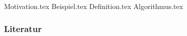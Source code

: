 \documentclass[aspectratio=\BeamerAspectRatio]{beamer}
\begin{document}
\maketitlepage %
\makesectionpopup %

{Motivation.tex}
{Beispiel.tex}
{Definition.tex}
{Algorithmus.tex}

\begin{frame}[allowframebreaks]
    \frametitle{Literatur}
    \printbibliography
\end{frame}
\end{document}
